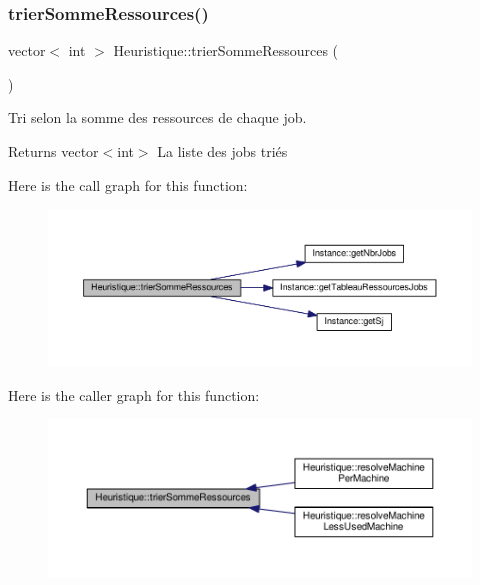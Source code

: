 \subsubsection{\texorpdfstring{trier\+Somme\+Ressources()}{trierSommeRessources()}}
{\footnotesize\ttfamily vector$<$ int $>$ Heuristique\+::trier\+Somme\+Ressources (\begin{DoxyParamCaption}{ }\end{DoxyParamCaption})}



Tri selon la somme des ressources de chaque job. 

\begin{DoxyReturn}{Returns}
vector$<$int$>$ La liste des jobs triés 
\end{DoxyReturn}
Here is the call graph for this function\+:\nopagebreak
\begin{figure}[H]
\begin{center}
\leavevmode
\includegraphics[width=350pt]{classHeuristique_a019587ee3112631f8369d8ffe6303f2c_cgraph}
\end{center}
\end{figure}
Here is the caller graph for this function\+:\nopagebreak
\begin{figure}[H]
\begin{center}
\leavevmode
\includegraphics[width=350pt]{classHeuristique_a019587ee3112631f8369d8ffe6303f2c_icgraph}
\end{center}
\end{figure}
\mbox{\label{classHeuristique_adc1f4075bda4dfbf40f6ed4cc8a6c993}} 
